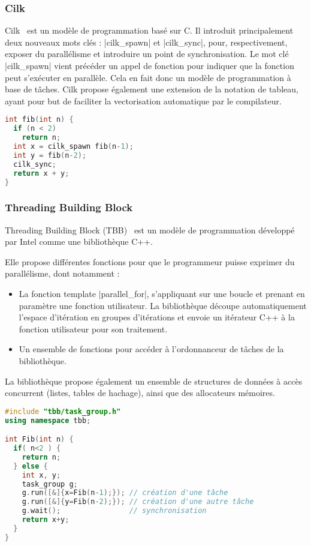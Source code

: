 \subsubsection{Cilk}

Cilk~\cite{cilk5} est un modèle de programmation basé sur C.
Il introduit principalement deux nouveaux mots clés : |cilk_spawn| et |cilk_sync|, pour, respectivement, exposer du parallélisme et introduire un point de synchronisation.
Le mot clé |cilk_spawn| vient précéder un appel de fonction pour indiquer que la fonction peut s'exécuter en parallèle. Cela en fait donc un modèle de programmation à base de tâches.
Cilk propose également une extension de la notation de tableau, ayant pour but de faciliter la vectorisation automatique par le compilateur.


\begin{lstlisting}[language=c++,caption=Fibonacci exprimé en Cilk,label=lst:context:cilk,basicstyle=\small]
int fib(int n) {
  if (n < 2)
    return n;
  int x = cilk_spawn fib(n-1);
  int y = fib(n-2);
  cilk_sync;
  return x + y;
}
\end{lstlisting}


\subsubsection{Threading Building Block}

Threading Building Block (TBB)~\cite{Reinders2007} est un modèle de programmation développé par Intel comme une bibliothèque C++.

Elle propose différentes fonctions pour que le programmeur puisse exprimer du parallélisme, dont notamment :
\begin{itemize}
  \item La fonction template |parallel_for|, s'appliquant sur une boucle et prenant en paramètre une fonction utilisateur.
    La bibliothèque découpe automatiquement l'espace d'itération en groupes d'itérations et envoie un itérateur C++ à la fonction utilisateur pour son traitement.
  \item Un ensemble de fonctions pour accéder à l'ordonnanceur de tâches de la bibliothèque.
\end{itemize}

La bibliothèque propose également un ensemble de structures de données à accès concurrent (listes, tables de hachage), ainsi que des allocateurs mémoires.

\begin{lstlisting}[language=c++,caption=Fibonacci exprimé en TBB,label=lst:context:tbb,basicstyle=\small]
#include "tbb/task_group.h"
using namespace tbb;

int Fib(int n) {
  if( n<2 ) {
    return n;
  } else {
    int x, y;
    task_group g;
    g.run([&]{x=Fib(n-1);}); // création d'une tâche
    g.run([&]{y=Fib(n-2);}); // création d'une autre tâche
    g.wait();                // synchronisation
    return x+y;
  }
}
\end{lstlisting}

